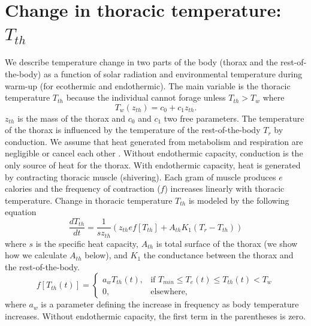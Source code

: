 \documentclass[12pt]{article}
\begin{document}
\section*{Change in thoracic temperature: $T_{th}$}
We describe temperature change in two parts of the body (thorax and the rest-of-the-body) as a function of solar radiation and environmental temperature during warm-up (for ecothermic and endothermic). 
The main variable is the thoracic temperature $T_{th}$ because the individual cannot forage unless $T_{th} > T_w$ where
\begin{equation} \label{eq:Tw}
	T_w(z_{th}) = c_0+ c_1 z_{th}.
\end{equation}
$z_{th}$ is the mass of the thorax and $c_0$ and $c_1$ two free parameters.
The temperature of the thorax is influenced by the temperature of the rest-of-the-body $T_r$ by conduction.
We assume that heat  generated from metabolism and respiration are negligible or cancel each other \citep{Angilletta2009}. 
Without endothermic capacity,  conduction is the only source of heat for the thorax.
With endothermic capacity, heat is generated by contracting thoracic muscle (shivering).
Each gram of muscle produces $e$ calories and the frequency of contraction ($f$) increases linearly with thoracic temperature.
Change in thoracic temperature $T_{th}$ is modeled by the following equation
\begin{equation} \label{eq:dTth}
	\frac{dT_{th}}{dt} = \frac{1}{s z_{th}} (z_{th} e f[T_{th}] +  A_{th} K_1(T_r - T_{th}))
\end{equation}
where $s$ is the specific heat capacity, $A_{th}$ is total surface of the thorax (we show how we calculate $A_{th}$ below), and $K_1$ the conductance between the thorax and the rest-of-the-body.
\[f[T_{th}(t)] = 
\begin{cases}
	 a_w T_{th}(t) , & \mbox{if } T_{min} \leq T_e(t) \leq T_{th}(t) < T_w \\
	0, & \mbox{elsewhere,}
\end{cases}\]
where $a_w$ is a parameter defining the increase in frequency as body temperature increases.
Without endothermic capacity, the first term in the parentheses is zero.
\end{document}
